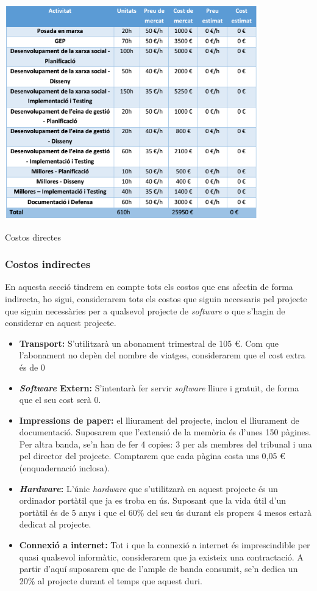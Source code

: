 \documentclass[11pt,catalan,listoffigures,listoftables]{tfgetsinf}
\begin{document}
\begin{table}[H]
\centering
\includegraphics[width=11cm]{images/taula2}
\caption[Taula 7.1]{Costos directes}
\centering
\end{table}

\subsubsection{Costos indirectes}

En aquesta secció tindrem en compte tots els costos que ens afectin de forma indirecta, ho sigui, considerarem tots els costos que siguin necessaris pel projecte que siguin necessàries per a qualsevol projecte de \textit{software} o que s’hagin de considerar en aquest projecte.
\begin{itemize}
	\item \textbf{Transport:} S’utilitzarà un abonament trimestral de 105 €. Com que l’abonament no depèn del nombre de viatges, considerarem que el cost extra és de 0%
	\item \textbf{\textit{Software} Extern:} S’intentarà fer servir \textit{software} lliure i gratuït, de forma que el seu cost serà 0.
	\item \textbf{Impressions de paper:} el lliurament del projecte, inclou el lliurament de documentació. Suposarem que l’extensió de la memòria és d’unes 150 pàgines. Per altra banda, se’n han de fer 4 copies: 3 per als membres del tribunal i una pel director del projecte. Comptarem que cada pàgina costa uns 0,05 € (enquadernació inclosa).
	\item \textbf{\textit{Hardware}:} L’únic \textit{hardware} que s’utilitzarà en aquest projecte és un ordinador portàtil que ja es troba en ús. Suposant que la vida útil d’un portàtil és de 5 anys i que el 60\% del seu ús durant els propers 4 mesos estarà dedicat al projecte.
	\item \textbf{Connexió a internet:} Tot i que la connexió a internet és imprescindible per quasi qualsevol informàtic, considerarem que ja existeix una contractació. A partir d’aquí suposarem que de l’ample de banda consumit, se’n dedica un 20\% al projecte durant el temps que aquest duri.
\end{itemize} 
\end{document}
